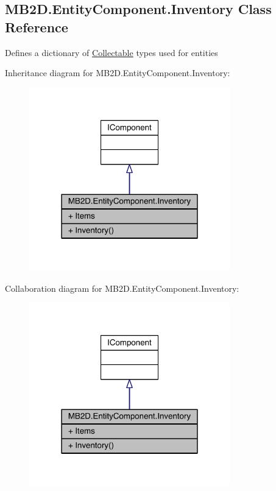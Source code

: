 \hypertarget{class_m_b2_d_1_1_entity_component_1_1_inventory}{}\subsection{M\+B2\+D.\+Entity\+Component.\+Inventory Class Reference}
\label{class_m_b2_d_1_1_entity_component_1_1_inventory}


Defines a dictionary of \hyperlink{class_m_b2_d_1_1_collectable}{Collectable} types used for entities  




Inheritance diagram for M\+B2\+D.\+Entity\+Component.\+Inventory\+:
\nopagebreak
\begin{figure}[H]
\begin{center}
\leavevmode
\includegraphics[width=247pt]{class_m_b2_d_1_1_entity_component_1_1_inventory__inherit__graph}
\end{center}
\end{figure}


Collaboration diagram for M\+B2\+D.\+Entity\+Component.\+Inventory\+:
\nopagebreak
\begin{figure}[H]
\begin{center}
\leavevmode
\includegraphics[width=247pt]{class_m_b2_d_1_1_entity_component_1_1_inventory__coll__graph}
\end{center}
\end{figure}
